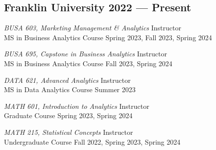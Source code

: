 
\subsection{{Franklin University \hfill 2022 --- Present}}
\begin{zitemize}
\item \textit{BUSA 603, Marketing Management \& Analytics} \hfill  Instructor \\
MS in Business Analytics Course \hfill Spring 2023, Fall 2023, Spring 2024 
\vspace{0.2ex}
\item \textit{BUSA 695, Capstone in Business Analytics} \hfill Instructor \\ 
MS in Business Analytics Course \hfill Fall 2023, Spring 2024
\vspace{0.2em}
\item \textit{DATA 621, Advanced Analytics} \hfill Instructor \\
MS in Data Analytics Course \hfill Summer 2023	
\vspace{0.2em}
\item \textit{MATH 601, Introduction to Analytics} \hfill Instructor \\
Graduate Course \hfill Spring 2023, Spring 2024
\vspace{0.2em}
\item \textit{MATH 215, Statistical Concepts} \hfill Instructor \\
Undergraduate Course \hfill Fall 2022, Spring 2023, Spring 2024
\end{zitemize}
\vspace{1.0em}

\newpage


